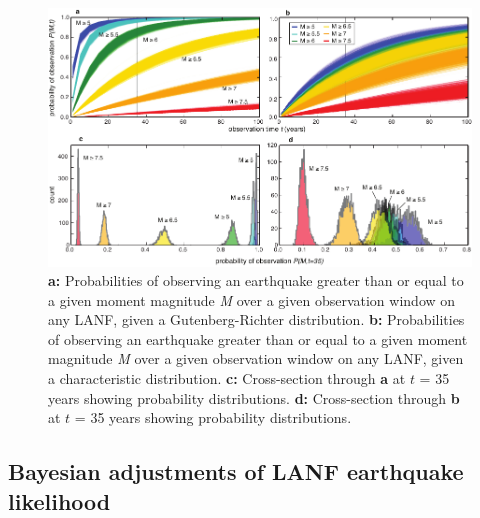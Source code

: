 \documentclass[twocolumn,grl]{AGUTeX}
\begin{document}
\begin{article}
\begin{figure}%
\noindent\includegraphics[width=40pc]{./figures/all_probs_2x2.pdf}

\caption{\textbf{a:} Probabilities of observing an earthquake greater than or
equal to a given moment magnitude \emph{M} over a given observation window on
any LANF, given a Gutenberg-Richter distribution.  \textbf{b:} Probabilities of
observing an earthquake greater than or equal to a given moment magnitude
\emph{M} over a given observation window on any LANF, given a characteristic
distribution.  \textbf{c:} Cross-section through \textbf{a} at $t$ = 35 years
showing probability distributions.  \textbf{d:} Cross-section through
\textbf{b} at $t$ = 35 years showing probability distributions.}

\label{fig:all_probs}
\end{figure}

\subsection{Bayesian adjustments of LANF earthquake likelihood}


\end{article}
\end{document}
